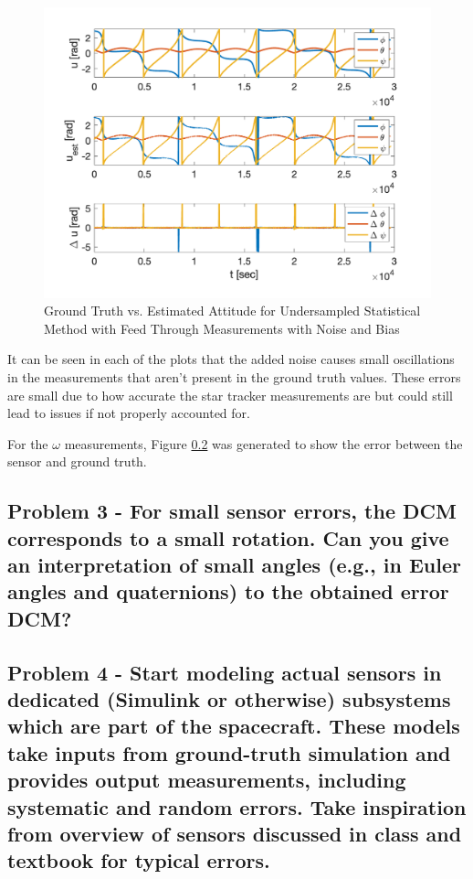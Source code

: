 \begin{figure}[H]
    \centering
    \captionsetup{ justification = centering }
    \includegraphics[width = 12cm]{Images/PS7/attitude_estimation_undersampled_q_default.png}
    \caption{Ground Truth vs. Estimated Attitude for Undersampled Statistical Method with Feed Through Measurements with Noise and Bias}
    \label{fig:stat_attitude_undersampled_default_noise}
\end{figure}

It can be seen in each of the plots that the added noise causes small oscillations in the measurements that aren't present in the ground truth values. These errors are small due to how accurate the star tracker measurements are but could still lead to issues if not properly accounted for.

For the $\omega$ measurements, Figure \ref{} was generated to show the error between the sensor and ground truth.




\subsection{Problem 3 - For small sensor errors, the DCM corresponds to a small rotation. Can you give an interpretation of small angles (e.g., in Euler angles and quaternions) to the obtained error DCM?}

\subsection{Problem 4 - Start modeling actual sensors in dedicated (Simulink or otherwise) subsystems which are part of the spacecraft. These models take inputs from ground-truth simulation and provides output measurements, including systematic and random errors. Take inspiration from overview of sensors discussed in class and
textbook for typical errors.}

